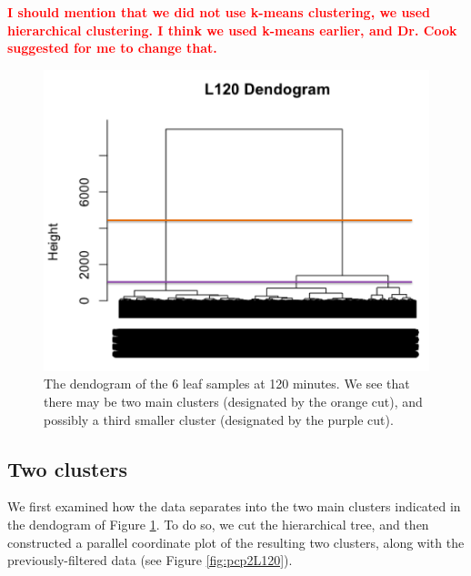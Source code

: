 \documentclass[11pt,a4paper,oldfontcommands,openany]{memoir}
\numberwithin{equation}{section} %
\begin{document}
\textbf{\textcolor{Red}{I should mention that we did not use k-means clustering, we used hierarchical clustering. I think we used k-means earlier, and Dr. Cook suggested for me to change that.}}

\begin{figure}[H]
    \begin{framed}
    \centering
    \includegraphics[width=\textwidth]{dendL120}
    \end{framed}
    \caption{The dendogram of the 6 leaf samples at 120 minutes. We see that there may be two main clusters (designated by the orange cut), and possibly a third smaller cluster (designated by the purple cut).}
    \label{fig:dendL120}
\end{figure}

\subsection{Two clusters}

We first examined how the data separates into the two main clusters indicated in the dendogram of Figure \ref{fig:dendL120}. To do so, we cut the hierarchical tree, and then constructed a parallel coordinate plot of the resulting two clusters, along with the previously-filtered data (see Figure \ref{fig:pcp2L120}).
\end{document}
